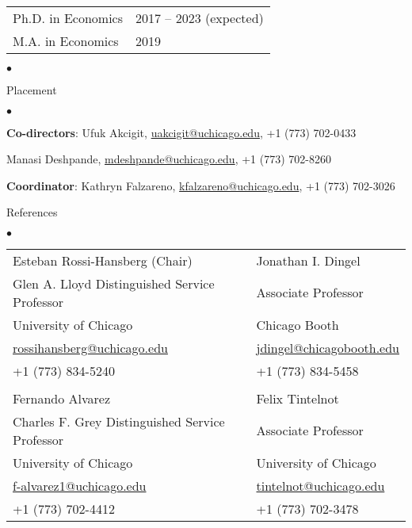 \documentclass[margin,line]{res}
\newenvironment{list0}{
  \begin{list}{$\bullet$}{%
      \setlength{\itemsep}{0in}
      \setlength{\parsep}{0in} \setlength{\parskip}{0in}
      \setlength{\topsep}{0in} \setlength{\partopsep}{0in}
      \setlength{\leftmargin}{0.0in}}}{\end{list}}
\newenvironment{list1}{
  \begin{list}{$\bullet$}{%
      \setlength{\itemsep}{0in}
      \setlength{\parsep}{0in} \setlength{\parskip}{0in}
      \setlength{\topsep}{0in} \setlength{\partopsep}{0in}
      \setlength{\leftmargin}{0.17in}}}{\end{list}}
\begin{document}
\begin{resume}
\begin{tabular}{ll}
    Ph.D. in Economics & 2017 -- 2023 (expected) \\
    M.A. in Economics & 2019 \\
\end{tabular}
\vspace*{.1in}
\begin{list0}
    \item[] {\sc Placement} \\
    \vspace*{-2mm}
    \begin{list1}
        \item[] \textbf{Co-directors}:
        Ufuk Akcigit,
        \url{uakcigit@uchicago.edu},
        +1 (773) 702-0433
        \item[] 
        Manasi Deshpande,
        \url{mdeshpande@uchicago.edu},
        +1 (773) 702-8260
        \item[] \textbf{Coordinator}:
        Kathryn Falzareno,
        \url{kfalzareno@uchicago.edu},
        +1 (773) 702-3026
    \end{list1}
    \vspace*{.09in}
    \item[] {\sc References} \\
    \vspace*{-2mm}
    \begin{list1}
        \item[]
        \begin{tabular}{@{}p{3in}p{3in}}
            Esteban Rossi-Hansberg (Chair) & Jonathan I. Dingel \\
            Glen A. Lloyd Distinguished Service Professor & Associate Professor \\
            University of Chicago & Chicago Booth \\
            \url{rossihansberg@uchicago.edu} & \url{jdingel@chicagobooth.edu} \\
            +1 (773) 834-5240 & +1 (773) 834-5458 \\
            & \\
            Fernando Alvarez & Felix Tintelnot \\
            Charles F. Grey Distinguished Service Professor & Associate Professor \\
            University of Chicago & University of Chicago \\
            \url{f-alvarez1@uchicago.edu} & \url{tintelnot@uchicago.edu} \\
            +1 (773) 702-4412 & +1 (773) 702-3478
        \end{tabular}
    \end{list1}
\end{list0}


\end{resume}
\end{document}
